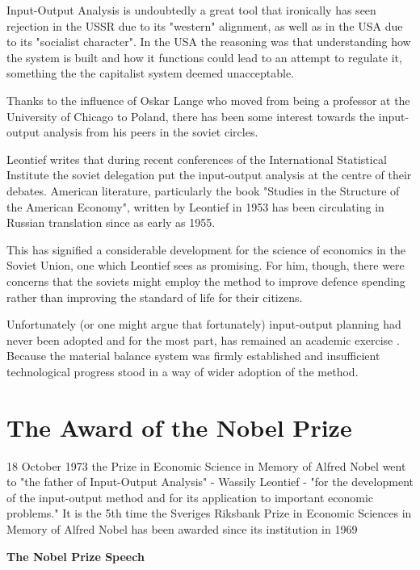 \documentclass[12pt,a4paper]{scrartcl}
\begin{document}
	Input-Output Analysis is undoubtedly a great tool that ironically has seen rejection in the USSR due to its "western" alignment, as well as in the USA due to its "socialist character". In the USA the reasoning was that understanding how the system is built and how it functions could lead to an attempt to regulate it, something the the capitalist system deemed unacceptable.
	
	Thanks to the influence of Oskar Lange who moved from being a professor at the University of Chicago to Poland, there has been some interest towards the input-output analysis from his peers in the soviet circles.
	
	Leontief writes that during recent conferences of the International Statistical Institute the soviet delegation put the input-output analysis at the centre of their debates. American literature, particularly the book "Studies in the Structure of the American Economy", written by Leontief in 1953 has been circulating in Russian translation since as early as 1955.
	
	This has signified a considerable development for the science of economics in the Soviet Union, one which Leontief sees as promising. For him, though, there were concerns that the soviets might employ the method to improve defence spending rather than improving the standard of life for their citizens. \cite[]{leontief1960niedergang}
	
	Unfortunately (or one might argue that fortunately) input-output planning had never been adopted and for the most part, has remained an academic exercise \cite[p.79]{Cockshott2004}. Because the material balance system was firmly established and insufficient technological progress stood in a way of wider adoption of the method.
	
	\section{The Award of the Nobel Prize} \label{nobelprize}
	
	18 October 1973 the Prize in Economic Science in Memory of Alfred Nobel went to "the father of Input-Output Analysis" - Wassily Leontief - "for the development of the input-output method and for its application to important economic problems." \cite[]{nobelpress} It is the 5th time the Sveriges Riksbank Prize in Economic Sciences in Memory of Alfred Nobel has been awarded since its institution in 1969
	
	\textbf{The Nobel Prize Speech}
	
\end{document}

